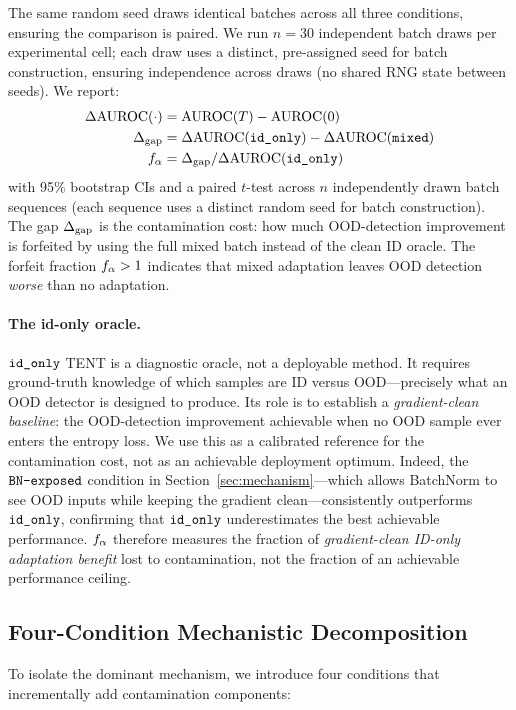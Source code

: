 The same random seed draws identical batches across all three conditions, ensuring the comparison is paired.
We run $n = 30$ independent batch draws per experimental cell; each draw uses a distinct, pre-assigned seed for batch construction, ensuring independence across draws (no shared RNG state between seeds).
We report:
\begin{align}
  \Delta\text{AUROC}(\cdot) &= \text{AUROC}(T) - \text{AUROC}(0) \label{eq:delta_auroc}\\
  \Delta_{\text{gap}} &= \Delta\text{AUROC}(\texttt{id\_only}) - \Delta\text{AUROC}(\texttt{mixed}) \label{eq:gap}\\
  f_\alpha &= \Delta_{\text{gap}} / \Delta\text{AUROC}(\texttt{id\_only}) \label{eq:forfeit}
\end{align}
with 95\% bootstrap CIs and a paired $t$-test across $n$ independently drawn batch sequences (each sequence uses a distinct random seed for batch construction).
The gap $\Delta_{\text{gap}}$ is the contamination cost: how much OOD-detection improvement is forfeited by using the full mixed batch instead of the clean ID oracle.
The forfeit fraction $f_\alpha > 1$ indicates that mixed adaptation leaves OOD detection \emph{worse} than no adaptation.

\paragraph{The id-only oracle.}
$\texttt{id\_only}$ TENT is a diagnostic oracle, not a deployable method.
It requires ground-truth knowledge of which samples are ID versus OOD---precisely what an OOD detector is designed to produce.
Its role is to establish a \emph{gradient-clean baseline}: the OOD-detection improvement achievable when no OOD sample ever enters the entropy loss.
We use this as a calibrated reference for the contamination cost, not as an achievable deployment optimum.
Indeed, the $\texttt{BN-exposed}$ condition in Section~\ref{sec:mechanism}---which allows BatchNorm to see OOD inputs while keeping the gradient clean---consistently outperforms $\texttt{id\_only}$, confirming that $\texttt{id\_only}$ underestimates the best achievable performance.
$f_\alpha$ therefore measures the fraction of \emph{gradient-clean ID-only adaptation benefit} lost to contamination, not the fraction of an achievable performance ceiling.

\subsection{Four-Condition Mechanistic Decomposition}

To isolate the dominant mechanism, we introduce four conditions that incrementally add contamination components:

